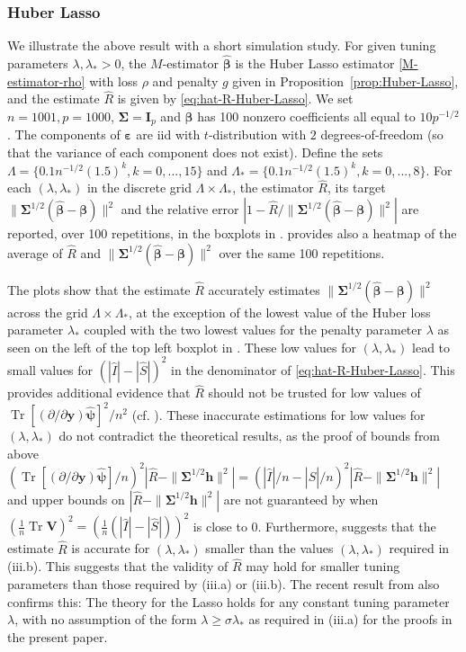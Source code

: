 \documentclass[11pt]{amsart}
\numberwithin{equation}{section}
\numberwithin{equation}{section}
\DeclareMathOperator{\trace}{Tr}
\def\mathbold{\boldsymbol} %
\def\bh{\mathbold{h}}\def\hhat{\widehat{h}}\def\htil{\widetilde{h}}
\def\bI{\mathbold{I}}\def\hbI{{\widehat{\bI}}}\def\tbI{{\widetilde{\bI}}}
\def\bV{\mathbold{V}}\def\hbV{{\widehat{\bV}}}\def\tbV{{\widetilde{\bV}}}
\def\by{\mathbold{y}}\def\yhat{\widehat{y}}\def\ytil{\widetilde{y}}\def\ybar{{\overline y}}\def\vby{{\bf y}}
\def\bbeta{\mathbold{\beta}}\def\betahat{\widehat{\beta}}\def\hbeta{\widehat{\beta}}
\def\hbbeta{{{\widehat{\bbeta}}}}
\def\ep{\varepsilon}\def\eps{\epsilon}\def\veps{\varepsilon}
\def\bep{ {\mathbold{\ep} }}
\def\bSigma{\mathbold{\Sigma}}\def\hbSigma{{\widehat{\bSigma}}}
\def\bpsi{\mathbold{\psi}}\def\psihat{\widehat{\psi}}\def\hpsi{\widehat{\psi}}
\def\hbpsi{{\widehat{\bpsi}}}\def\tbpsi{{\widetilde{\bpsi}}}
\newcommand\pb[1]{{ #1 }}
\begin{document}
\subsubsection{Huber Lasso}
We illustrate the above result with a short simulation study.
For given tuning parameters $\lambda,\lambda_*>0$,
the $M$-estimator
$\hbbeta$ is the Huber Lasso estimator \eqref{M-estimator-rho}
with loss $\rho$ and penalty $g$ given in Proposition~\ref{prop:Huber-Lasso},
and the estimate $\hat R$ is given by \eqref{eq:hat-R-Huber-Lasso}.
We set $n=1001, p=1000$, $\bSigma=\bI_p$
and $\bbeta$ has 100 nonzero coefficients
all equal to $10 p^{-1/2}$.
The components of $\bep$ are iid with $t$-distribution 
with $2$ degrees-of-freedom (so that the variance of each component
does not exist).
Define the sets
$\Lambda = \{ 0.1 n^{-1/2}  (1.5)^k, k=0,...,15\}$ and
$\Lambda_* = \{ 0.1 n^{-1/2} (1.5)^k, k=0,...,8\}$.
For each $(\lambda,\lambda_*)$ in the discrete grid
$\Lambda \times \Lambda_*$,
the estimator 
$\hat R$, its target $\|\bSigma^{1/2}(\hbbeta - \bbeta)\|^2$
and the relative error $|1-\hat R/\|\bSigma^{1/2}(\hbbeta - \bbeta)\|^2|$
are reported, over 100 repetitions, in the boxplots in .
 provides also a heatmap of the average of $\hat R$
and $\|\bSigma^{1/2}(\hbbeta - \bbeta)\|^2$ over the same 100 repetitions.

The plots show that the estimate $\hat R$
accurately estimates $\|\bSigma^{1/2}(\hbbeta - \bbeta)\|^2$ across the grid
$\Lambda \times \Lambda_*$,
at the exception of the lowest value of the Huber loss parameter
$\lambda_*$ coupled
with the two lowest values for the penalty parameter $\lambda$
as seen on the left of the top left boxplot in .
These low values for $(\lambda,\lambda_*)$ lead to small
values for $(|\hat I|-|\hat S|)^2$ in the denominator of \eqref{eq:hat-R-Huber-Lasso}. This provides additional evidence that
$\hat R$ should not be trusted for low values 
of $\trace[(\partial/\partial\by)\hbpsi]^2/n^2$
(cf. ).
These inaccurate estimations for low values for $(\lambda,\lambda_*)$
do not contradict the theoretical results, as the proof
of  bounds from above
$(\trace[(\partial/\partial\by)\hbpsi]/n)^2
|\hat R - \|\bSigma^{1/2}\bh\|^2|
=(|\hat I|/n-|\hat S|/n)^2
|\hat R - \|\bSigma^{1/2}\bh\|^2|$ 
and upper bounds on
$|\hat R - \|\bSigma^{1/2}\bh\|^2|$
are not guaranteed by 
when $(\frac 1 n \trace \bV)^2=(\frac 1 n (|\hat I|-|\hat S|))^2$ is close to 0.
Furthermore,  suggests that the estimate $\hat R$
is accurate for $(\lambda,\lambda_*)$ smaller than 
the values $(\lambda,\lambda_*)$
required in (iii.b).
\pb{
This suggests
that the validity of $\hat R$ may hold for smaller tuning parameters
than those required 
by \Cref{assum:g}(iii.a) or (iii.b). The recent result from
\cite{celentano2020lasso} also confirms this: The theory for the Lasso
\cite{celentano2020lasso} holds for any constant tuning parameter $\lambda$, with no assumption
of the form $\lambda\ge\sigma\lambda_*$ as required
in \Cref{assum:g}(iii.a) for the proofs in the present paper.
}
\end{document}

